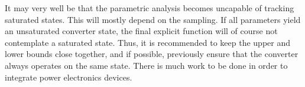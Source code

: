 It may very well be that the parametric analysis becomes uncapable of tracking saturated states. This will mostly depend on the sampling. If all parameters yield an unsaturated converter state, the final explicit function will of course not contemplate a saturated state. Thus, it is recommended to keep the upper and lower bounds close together, and if possible, previously ensure that the converter always operates on the same state. There is much work to be done in order to integrate power electronics devices.  


